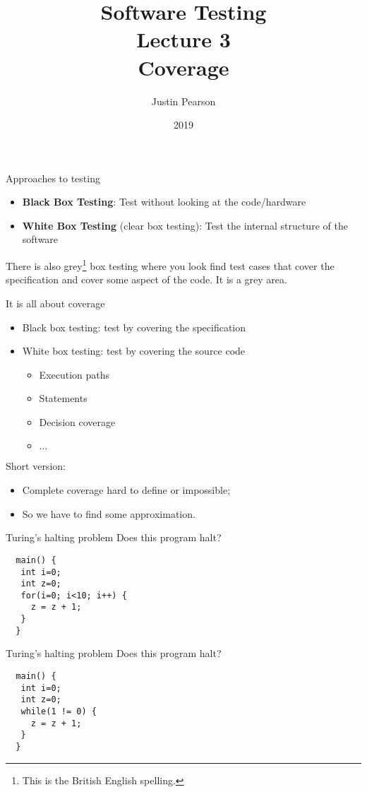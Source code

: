 \documentclass[handout]{beamer}
\title{Software Testing\\ Lecture 3\\ Coverage}
\author{Justin Pearson}
\date{2019}
\begin{document}
\lstset{language=C}

\begin{frame}
  \maketitle
\end{frame}

\begin{frame}{Approaches to testing}
  \begin{itemize}
  \item {\bf Black Box Testing}: Test without looking at the code/hardware
  \item {\bf White Box Testing} (clear box testing):  Test the internal
    structure of the software
  \end{itemize}
  There is also grey\footnote{This is the British English spelling.} box testing where you look find test cases that cover the
  specification and cover some aspect of the code.  It is a grey area.  
\end{frame}
\begin{frame}{It is all about coverage}
  \begin{itemize}
  \item Black box testing: test by covering the specification
  \item White box testing: test by covering the source code
    \begin{itemize}
    \item Execution paths
    \item Statements
    \item Decision coverage
    \item $\ldots$
    \end{itemize}
  \end{itemize}
  Short version:
  \begin{itemize}
  \item  Complete coverage hard to define or impossible;
  \item  So we have to find some approximation.
  \end{itemize}
\end{frame}

\begin{frame}[fragile]{Turing's halting problem}
Does this program halt?
\begin{lstlisting}
  main() {
   int i=0;
   int z=0;
   for(i=0; i<10; i++) {
     z = z + 1;
   }
  }
\end{lstlisting}
\end{frame}
\begin{frame}[fragile]{Turing's halting problem}
Does this program halt?
\begin{lstlisting}
  main() {
   int i=0;
   int z=0;
   while(1 != 0) {
     z = z + 1;
   }
  }
\end{lstlisting}
\end{frame}
\end{document}
